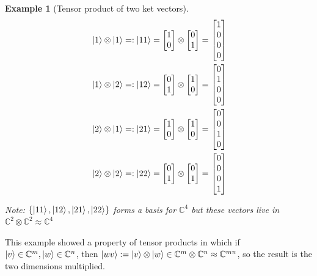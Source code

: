 \documentclass[12pt]{article}
\theoremstyle{plain}
\theoremstyle{nonumberplain}
\theoremstyle{plain}
\newtheorem{example}[lemma]{Example}
\theoremstyle{nonumberplain}
\newcommand\1{{\bf 1}}
\newcommand{\bmat}[1]{\begin{bmatrix*} #1 \end{bmatrix*}} %
\newcommand{\C}{\mathbb{C}} %
\newcommand{\<}{\left\langle}
\renewcommand{\>}{\right\rangle}
\begin{document}
\begin{example} [Tensor product of two ket vectors]

\begin{align*}
&\ket{1} \otimes \ket{1} =: \ket{11} = \bmat{1\\0} \otimes \bmat{0\\1} = \bmat{1\\0\\0\\0}\\
&\ket{1} \otimes \ket{2} =: \ket{12} = \bmat{0\\1} \otimes \bmat{1\\0} = \bmat{0\\1\\0\\0}\\
&\ket{2} \otimes \ket{1} =: \ket{21} = \bmat{1\\0} \otimes \bmat{1\\0} = \bmat{0\\0\\1\\0}\\
&\ket{2} \otimes \ket{2} =: \ket{22} = \bmat{0\\1} \otimes \bmat{0\\1} = \bmat{0\\0\\0\\1}\\
\end{align*}
\begin{center}
\textit{Note: $\{\ket{11}, \ket{12}, \ket{21}, \ket{22}\}$ forms a basis for $\C^4$ but these vectors live in $\C^2 \otimes \C^2 \approx \C^4$}
\end{center}
\end{example}
This example showed a property of tensor products in which if $\ket{v} \in \C^m, \ket{w} \in \C^n$, then $\ket{wv} := \ket{v} \otimes \ket{w} \in \C^m \otimes \C^n \approx \C^{mn}$, so the result is the two dimensions multiplied.
\end{document}
